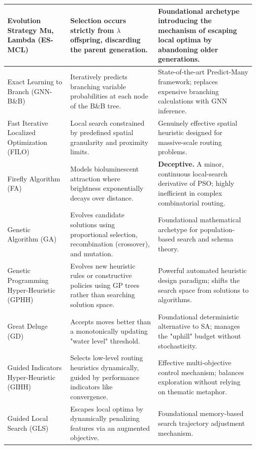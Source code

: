 \documentclass[orivec,runningheads]{llncs}
\begin{document}
\begin{center}
\begin{longtable}
\begin{center}
\begin{longtable}{
  >{\raggedright\arraybackslash}p{}
  >{\raggedright\arraybackslash}p{}
  >{\raggedright\arraybackslash}p{}
}
Evolution Strategy Mu, Lambda (ES-MCL) & Selection occurs strictly from $\lambda$ offspring, discarding the parent generation. & Foundational archetype introducing the mechanism of escaping local optima by abandoning older generations. \\ \midrule

Exact Learning to Branch (GNN-B\&B) & Iteratively predicts branching variable probabilities at each node of the B\&B tree. & State-of-the-art Predict-Many framework; replaces expensive branching calculations with GNN inference. \\ \midrule

Fast Iterative Localized Optimization (FILO) & Local search constrained by predefined spatial granularity and proximity limits. & Genuinely effective spatial heuristic designed for massive-scale routing problems. \\ \midrule

Firefly Algorithm (FA) & Models bioluminescent attraction where brightness exponentially decays over distance. & \textbf{Deceptive.} A minor, continuous local-search derivative of PSO; highly inefficient in complex combinatorial routing. \\ \midrule

Genetic Algorithm (GA) & Evolves candidate solutions using proportional selection, recombination (crossover), and mutation. & Foundational mathematical archetype for population-based search and schema theory. \\ \midrule

Genetic Programming Hyper-Heuristic (GPHH) & Evolves new heuristic rules or constructive policies using GP trees rather than searching solution space. & Powerful automated heuristic design paradigm; shifts the search space from solutions to algorithms. \\ \midrule

Great Deluge (GD) & Accepts moves better than a monotonically updating "water level" threshold. & Foundational deterministic alternative to SA; manages the "uphill" budget without stochasticity. \\ \midrule

Guided Indicators Hyper-Heuristic (GIHH) & Selects low-level routing heuristics dynamically, guided by performance indicators like convergence. & Effective multi-objective control mechanism; balances exploration without relying on thematic metaphor. \\ \midrule

Guided Local Search (GLS) & Escapes local optima by dynamically penalizing features via an augmented objective. & Foundational memory-based search trajectory adjustment mechanism. \\ \midrule


\end{longtable}
\end{center}
\end{longtable}
\end{center}
\end{document}
